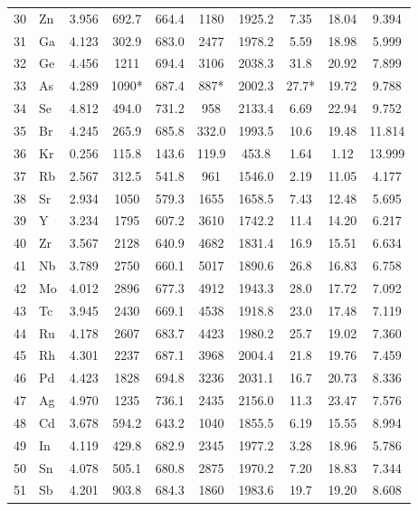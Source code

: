 \documentclass[11pt,a4paper]{article}
\begin{document}
\begin{english}
\begin{longtable}{@{}llcccccccc@{}}
			30 & Zn  & 3.956 & 692.7  & 664.4  & 1180   & 1925.2 & 7.35  & 18.04 & 9.394 \\
			31 & Ga  & 4.123 & 302.9  & 683.0  & 2477   & 1978.2 & 5.59  & 18.98 & 5.999 \\
			32 & Ge  & 4.456 & 1211   & 694.4  & 3106   & 2038.3 & 31.8  & 20.92 & 7.899 \\
			33 & As  & 4.289 & 1090*  & 687.4  & 887*   & 2002.3 & 27.7* & 19.72 & 9.788 \\
			34 & Se  & 4.812 & 494.0  & 731.2  & 958    & 2133.4 & 6.69  & 22.94 & 9.752 \\
			35 & Br  & 4.245 & 265.9  & 685.8  & 332.0  & 1993.5 & 10.6  & 19.48 & 11.814 \\
			36 & Kr  & 0.256 & 115.8  & 143.6  & 119.9  & 453.8  & 1.64  & 1.12  & 13.999 \\
			37 & Rb  & 2.567 & 312.5  & 541.8  & 961    & 1546.0 & 2.19  & 11.05 & 4.177 \\
			38 & Sr  & 2.934 & 1050   & 579.3  & 1655   & 1658.5 & 7.43  & 12.48 & 5.695 \\
			39 & Y   & 3.234 & 1795   & 607.2  & 3610   & 1742.2 & 11.4  & 14.20 & 6.217 \\
			40 & Zr  & 3.567 & 2128   & 640.9  & 4682   & 1831.4 & 16.9  & 15.51 & 6.634 \\
			41 & Nb  & 3.789 & 2750   & 660.1  & 5017   & 1890.6 & 26.8  & 16.83 & 6.758 \\
			42 & Mo  & 4.012 & 2896   & 677.3  & 4912   & 1943.3 & 28.0  & 17.72 & 7.092 \\
			43 & Tc  & 3.945 & 2430   & 669.1  & 4538   & 1918.8 & 23.0  & 17.48 & 7.119 \\
			44 & Ru  & 4.178 & 2607   & 683.7  & 4423   & 1980.2 & 25.7  & 19.02 & 7.360 \\
			45 & Rh  & 4.301 & 2237   & 687.1  & 3968   & 2004.4 & 21.8  & 19.76 & 7.459 \\
			46 & Pd  & 4.423 & 1828   & 694.8  & 3236   & 2031.1 & 16.7  & 20.73 & 8.336 \\
			47 & Ag  & 4.970 & 1235   & 736.1  & 2435   & 2156.0 & 11.3  & 23.47 & 7.576 \\
			48 & Cd  & 3.678 & 594.2  & 643.2  & 1040   & 1855.5 & 6.19  & 15.55 & 8.994 \\
			49 & In  & 4.119 & 429.8  & 682.9  & 2345   & 1977.2 & 3.28  & 18.96 & 5.786 \\
			50 & Sn  & 4.078 & 505.1  & 680.8  & 2875   & 1970.2 & 7.20  & 18.83 & 7.344 \\
			51 & Sb  & 4.201 & 903.8  & 684.3  & 1860   & 1983.6 & 19.7  & 19.20 & 8.608 \\

\end{longtable}
\end{english}
\end{document}
